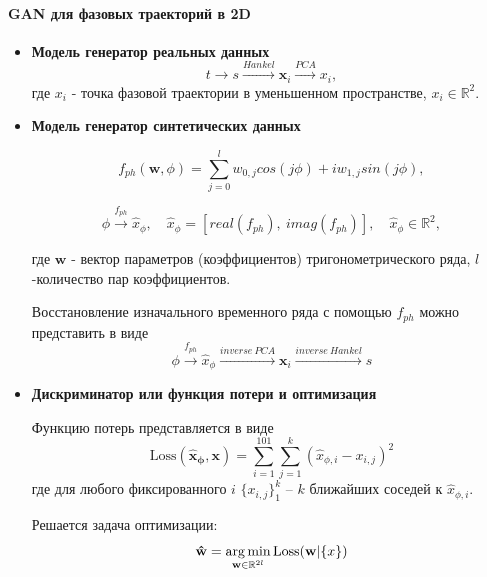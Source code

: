 \documentclass[12pt,twoside]{article}
\begin{document}
\paragraph{GAN для фазовых траекторий в 2D}

\begin{itemize}
\item \textbf{Модель генератор реальных данных}
\begin{equation}
	t \xrightarrow{} s\xrightarrow{Hankel}  \mathbf{x}_i \xrightarrow{PCA} x_i,
	\label{eq:GAN_real}
\end{equation}
где $x_i$ - точка фазовой траектории в уменьшенном пространстве, $x_i \in \mathbb{R}^2$.
\end{itemize}

\begin{itemize}
\item \textbf{Модель генератор синтетических данных}

\begin{equation}
	f_{ph}(\mathbf{w},\phi) = \sum_{j=0}^{l} w_{0,j}cos(j\phi) + i w_{1,j}sin(j\phi),
\label{eq:f_ph}
\end{equation}

\begin{equation}
	\phi \xrightarrow{f_{ph}} \hat{x}_{\phi},
	\quad
	\hat{x}_{\phi} = [real(f_{ph}),\:imag(f_{ph})],
	\quad
	\hat{x}_{\phi}  \in \mathbb{R}^2,
\label{eq:GAN_fake_1}
\end{equation}
\vspace{\baselineskip}

где $\mathbf{w}$ - вектор параметров (коэффициентов) тригонометрического ряда, $l$-количество пар коэффициентов.

Восстановление изначального временного ряда с помощью $f_{ph}$ можно представить в виде
\begin{equation}
	\phi \xrightarrow{f_{ph}} \hat{x}_{\phi} \xrightarrow{inverse~PCA}  \mathbf{x}_i \xrightarrow{inverse~Hankel}s
\label{eq:GAN_fake_2}
\end{equation}
\end{itemize}

\begin{itemize}
\item \textbf{Дискриминатор или функция потери и оптимизация}

Функцию потерь представляется в виде
\begin{equation}
\textrm{Loss}\mathbf{(\hat{x}_{\phi},x)} =  \sum_{i=1}^{101}\sum_{j=1}^{k}(\hat{x}_{\phi,i} - x_{i,j})^2
\label{eq:L}
\end{equation}
где для любого фиксированного $i$\; $\{x_{i,j}\}_1^k$ -- $k$ ближайших соседей к $\hat{x}_{\phi,i}$.

Решается задача оптимизации:
\begin{equation}
\mathbf{\hat{w}} = \argmin_{\mathbf{w} \in \mathbb{R}^{2l}} \textrm{Loss}(\mathbf{w}|\{x\})
\label{eq:arg_l}
\end{equation}
\end{itemize}
\end{document}
